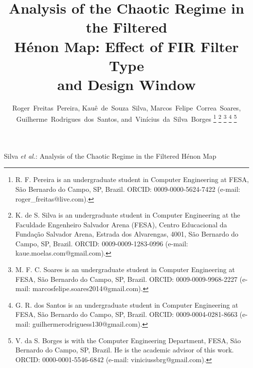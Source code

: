 \documentclass[journal]{IEEEtran}
\begin{document}
\title{Analysis of the Chaotic Regime in the Filtered\\ H\'enon Map: Effect of FIR Filter Type\\ and Design Window}

\author{Roger~Freitas~Pereira,
        Kau\^e~de~Souza~Silva,
        Marcos~Felipe~Correa~Soares,
        Guilherme~Rodrigues~dos~Santos,
        and~Vin\'icius~da~Silva~Borges%
\thanks{R. F. Pereira is an undergraduate student in Computer Engineering
at FESA, S\~ao Bernardo do Campo, SP, Brazil. ORCID: 0009-0000-5624-7422
(e-mail: roger\_freitas@live.com).}%
\thanks{K. de S. Silva is an undergraduate student in Computer Engineering
at the Faculdade Engenheiro Salvador Arena (FESA), Centro Educacional da
Funda\c{c}\~ao Salvador Arena, Estrada dos Alvarengas, 4001, S\~ao Bernardo
do Campo, SP, Brazil. ORCID: 0009-0009-1283-0996 (e-mail:
kaue.moelas.com@gmail.com).}%
\thanks{M. F. C. Soares is an undergraduate student in Computer Engineering
at FESA, S\~ao Bernardo do Campo, SP, Brazil. ORCID: 0009-0009-9968-2227
(e-mail: marcosfelipe.soares2014@gmail.com).}%
\thanks{G. R. dos Santos is an undergraduate student in Computer Engineering
at FESA, S\~ao Bernardo do Campo, SP, Brazil. ORCID: 0009-0004-0281-8663
(e-mail: guilhermerodriguess130@gmail.com).}%
\thanks{V. da S. Borges is with the Computer Engineering Department, FESA,
S\~ao Bernardo do Campo, SP, Brazil. He is the academic advisor of this
work. ORCID: 0000-0001-5546-6842 (e-mail: viniciussbrg@gmail.com).}%
}

%
{Silva \MakeLowercase{\textit{et al.}}: Analysis of the Chaotic Regime in the Filtered H\'enon Map}

\maketitle
\end{document}
